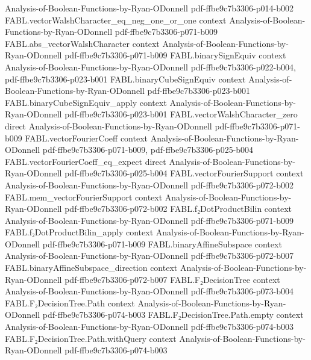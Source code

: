 \begin{theorem}
  {Analysis-of-Boolean-Functions-by-Ryan-ODonnell}
  {pdf-ffbe9c7b3306-p014-b002}
\proofstep
  {FABL.vectorWalshCharacter_eq_neg_one_or_one}
  {context}
  {Analysis-of-Boolean-Functions-by-Ryan-ODonnell}
  {pdf-ffbe9c7b3306-p071-b009}
\proofstep
  {FABL.abs_vectorWalshCharacter}
  {context}
  {Analysis-of-Boolean-Functions-by-Ryan-ODonnell}
  {pdf-ffbe9c7b3306-p071-b009}
\proofstep
  {FABL.binarySignEquiv}
  {context}
  {Analysis-of-Boolean-Functions-by-Ryan-ODonnell}
  {pdf-ffbe9c7b3306-p022-b004,
    pdf-ffbe9c7b3306-p023-b001}
\proofstep
  {FABL.binaryCubeSignEquiv}
  {context}
  {Analysis-of-Boolean-Functions-by-Ryan-ODonnell}
  {pdf-ffbe9c7b3306-p023-b001}
\proofstep
  {FABL.binaryCubeSignEquiv_apply}
  {context}
  {Analysis-of-Boolean-Functions-by-Ryan-ODonnell}
  {pdf-ffbe9c7b3306-p023-b001}
\proofstep
  {FABL.vectorWalshCharacter_zero}
  {direct}
  {Analysis-of-Boolean-Functions-by-Ryan-ODonnell}
  {pdf-ffbe9c7b3306-p071-b009}
\proofstep
  {FABL.vectorFourierCoeff}
  {context}
  {Analysis-of-Boolean-Functions-by-Ryan-ODonnell}
  {pdf-ffbe9c7b3306-p071-b009,
    pdf-ffbe9c7b3306-p025-b004}
\proofstep
  {FABL.vectorFourierCoeff_eq_expect}
  {direct}
  {Analysis-of-Boolean-Functions-by-Ryan-ODonnell}
  {pdf-ffbe9c7b3306-p025-b004}
\proofstep
  {FABL.vectorFourierSupport}
  {context}
  {Analysis-of-Boolean-Functions-by-Ryan-ODonnell}
  {pdf-ffbe9c7b3306-p072-b002}
\proofstep
  {FABL.mem_vectorFourierSupport}
  {context}
  {Analysis-of-Boolean-Functions-by-Ryan-ODonnell}
  {pdf-ffbe9c7b3306-p072-b002}
\proofstep
  {FABL.f₂DotProductBilin}
  {context}
  {Analysis-of-Boolean-Functions-by-Ryan-ODonnell}
  {pdf-ffbe9c7b3306-p071-b009}
\proofstep
  {FABL.f₂DotProductBilin_apply}
  {context}
  {Analysis-of-Boolean-Functions-by-Ryan-ODonnell}
  {pdf-ffbe9c7b3306-p071-b009}
\proofstep
  {FABL.binaryAffineSubspace}
  {context}
  {Analysis-of-Boolean-Functions-by-Ryan-ODonnell}
  {pdf-ffbe9c7b3306-p072-b007}
\proofstep
  {FABL.binaryAffineSubspace_direction}
  {context}
  {Analysis-of-Boolean-Functions-by-Ryan-ODonnell}
  {pdf-ffbe9c7b3306-p072-b007}
\proofstep
  {FABL.F₂DecisionTree}
  {context}
  {Analysis-of-Boolean-Functions-by-Ryan-ODonnell}
  {pdf-ffbe9c7b3306-p073-b004}
\proofstep
  {FABL.F₂DecisionTree.Path}
  {context}
  {Analysis-of-Boolean-Functions-by-Ryan-ODonnell}
  {pdf-ffbe9c7b3306-p074-b003}
\proofstep
  {FABL.F₂DecisionTree.Path.empty}
  {context}
  {Analysis-of-Boolean-Functions-by-Ryan-ODonnell}
  {pdf-ffbe9c7b3306-p074-b003}
\proofstep
  {FABL.F₂DecisionTree.Path.withQuery}
  {context}
  {Analysis-of-Boolean-Functions-by-Ryan-ODonnell}
  {pdf-ffbe9c7b3306-p074-b003}

\end{theorem}
